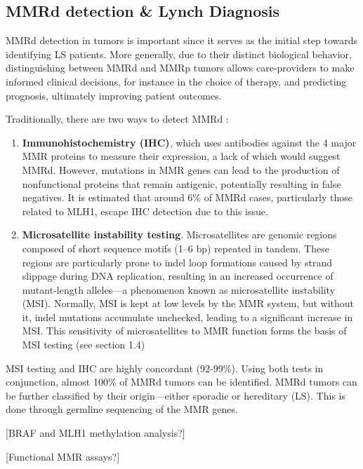 \documentclass[fleqn,10pt]{olplainarticle}
\begin{document}
\subsection{MMRd detection \& Lynch Diagnosis}

MMRd detection in tumors is important since it serves as the initial step towards identifying LS patients. More generally, due to their distinct biological behavior, distinguishing between MMRd and MMRp tumors allows care-providers to make informed clinical decisions, for instance in the choice of therapy, and predicting prognosis, ultimately improving patient outcomes. 

Traditionally, there are two ways to detect MMRd : 

\begin{enumerate}

\item \textbf{Immunohistochemistry (IHC)}, which uses antibodies against the 4 major MMR proteins to measure their expression, a lack of which would suggest MMRd. However, mutations in MMR genes can lead to the production of nonfunctional proteins that remain antigenic, potentially resulting in false negatives. It is estimated that around 6\% of MMRd cases, particularly those related to MLH1, escape IHC detection due to this issue. 

\item \textbf{Microsatellite instability testing}. Microsatellites are genomic regions composed of short sequence motifs (1–6 bp) repeated in tandem. These regions are particularly prone to indel loop formations caused by strand slippage during DNA replication, resulting in an increased occurrence of mutant-length alleles—a phenomenon known as microsatellite instability (MSI). Normally, MSI is kept at low levels by the MMR system, but without it, indel mutations accumulate unchecked, leading to a significant increase in MSI. This sensitivity of microsatellites to MMR function forms the basis of MSI testing (see section 1.4)

\end{enumerate}

MSI testing and IHC are highly concordant (92-99\%). Using both tests in conjunction, almost 100\% of MMRd tumors can be identified. MMRd tumors can be further classified by their origin—either sporadic or hereditary (LS). This is done through germline sequencing of the MMR genes. 

[BRAF and MLH1 methylation analysis?]

[Functional MMR assays?]
\end{document}

